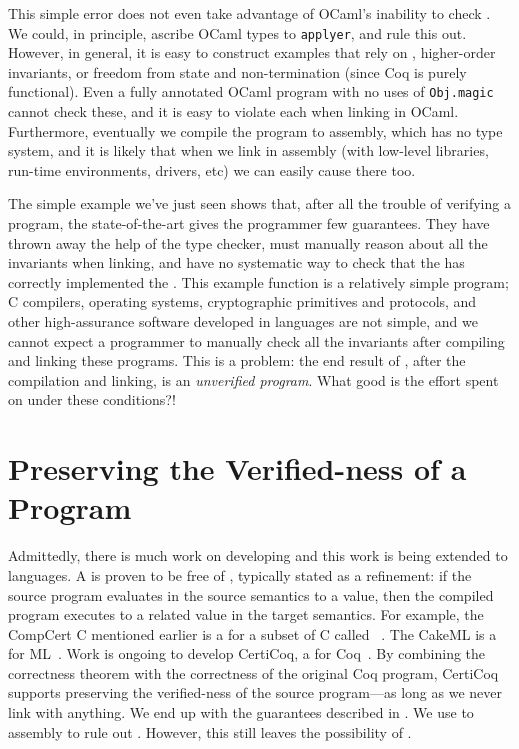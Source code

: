This simple error does not even take advantage of OCaml's inability to check
.
We could, in principle, ascribe OCaml types to \texttt{applyer}, and
rule this  out.
However, in general, it is easy to construct examples that rely on
, higher-order invariants, or freedom from state and
non-termination (since Coq is purely functional).
Even a fully annotated OCaml program with no uses of
\texttt{Obj.magic} cannot check these, and it is easy to violate each
when linking in OCaml.
Furthermore, eventually we compile the program to assembly, which has no type
system, and it is likely that when we link in assembly (with low-level
libraries, run-time environments, drivers, etc) we can easily cause
 there too.

The simple example we've just seen shows that, after all the trouble of
verifying a program, the state-of-the-art gives the programmer few
guarantees.
They have thrown away the help of the type checker, must manually reason about
all the invariants when linking, and have no systematic way to check that the
 has correctly implemented the .
This example function is a relatively simple program; C compilers, operating
systems, cryptographic primitives and protocols, and other high-assurance
software developed in  languages are not simple, and we
cannot expect a programmer to manually check all the invariants after compiling
and linking these programs.
This is a problem: the end result of , after the
compilation and linking, is an \emph{unverified program}.
What good is the effort spent on  under these
conditions?!

\section{Preserving the Verified-ness of a Program}
\label{sec:intro:pres-verif}
Admittedly, there is much work on developing  and this
work is being extended to  languages.
A  is proven to be free of ,
typically stated as a refinement: if the source program evaluates in the source
semantics to a value, then the compiled program executes to a related value in
the target semantics.
For example, the CompCert C  mentioned earlier is a
 for a subset of C called
~\cite{leroy2009:compcert-jfp}.
The CakeML  is a  for ML~\cite{kumar2014}.
Work is ongoing to develop CertiCoq, a  for Coq~\cite{anand2017}.
By combining the  correctness theorem with the correctness of the
original Coq program, CertiCoq supports preserving the verified-ness of the
source program---as long as we never link with anything.
We end up with the guarantees described in .
We use  to assembly to rule out .
However, this still leaves the possibility of .

